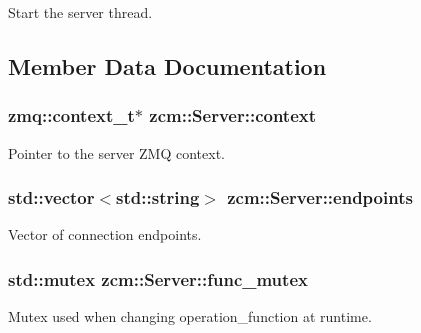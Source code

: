 Start the server thread. 



\subsection{Member Data Documentation}
\subsubsection[{\texorpdfstring{context}{context}}]{\setlength{\rightskip}{0pt plus 5cm}zmq\+::context\+\_\+t$\ast$ zcm\+::\+Server\+::context\hspace{0.3cm}{\ttfamily [private]}}\hypertarget{classzcm_1_1Server_a2de8909537ebb88665bfcca1f931c2f8}{}\label{classzcm_1_1Server_a2de8909537ebb88665bfcca1f931c2f8}


Pointer to the server Z\+MQ context. 

\subsubsection[{\texorpdfstring{endpoints}{endpoints}}]{\setlength{\rightskip}{0pt plus 5cm}std\+::vector$<$std\+::string$>$ zcm\+::\+Server\+::endpoints\hspace{0.3cm}{\ttfamily [private]}}\hypertarget{classzcm_1_1Server_a488d1398b76851565a4d116f7cf72af1}{}\label{classzcm_1_1Server_a488d1398b76851565a4d116f7cf72af1}


Vector of connection endpoints. 

\subsubsection[{\texorpdfstring{func\+\_\+mutex}{func_mutex}}]{\setlength{\rightskip}{0pt plus 5cm}std\+::mutex zcm\+::\+Server\+::func\+\_\+mutex\hspace{0.3cm}{\ttfamily [private]}}\hypertarget{classzcm_1_1Server_a3e36a37479457237786db9e163d6fef0}{}\label{classzcm_1_1Server_a3e36a37479457237786db9e163d6fef0}


Mutex used when changing operation\+\_\+function at runtime. 

